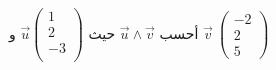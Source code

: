 \begin{frame}[label=ex1]%
\begin{exo}
	أحسب 
	$ 	\vec{u} \land \vec{v} $
		حيث 
$ \vec{u}\begin{pmatrix}1\\2\\-3\\	\end{pmatrix} $
و
  $ \vec{v}\ \begin{pmatrix}-2\\2\\5	\end{pmatrix} $
  \hyperlink{sol1}{}%
\end{exo}
\end{frame}


